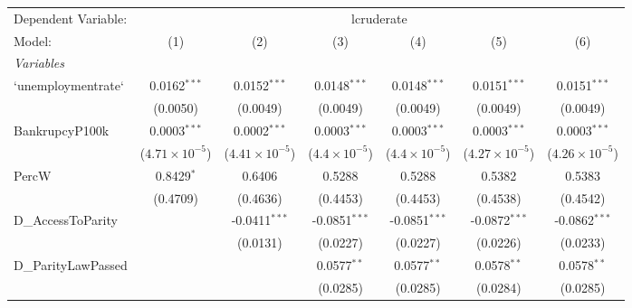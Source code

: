 
\begingroup
\centering
\begin{tabular}{lcccccc}
   \tabularnewline \midrule \midrule
   Dependent Variable: & \multicolumn{6}{c}{lcruderate}\\
   Model:                & (1)                     & (2)                     & (3)                    & (4)                    & (5)                     & (6)\\  
   \midrule
   \emph{Variables}\\
   `unemploymentrate`    & 0.0162$^{***}$          & 0.0152$^{***}$          & 0.0148$^{***}$         & 0.0148$^{***}$         & 0.0151$^{***}$          & 0.0151$^{***}$\\   
                         & (0.0050)                & (0.0049)                & (0.0049)               & (0.0049)               & (0.0049)                & (0.0049)\\   
   BankrupcyP100k        & 0.0003$^{***}$          & 0.0002$^{***}$          & 0.0003$^{***}$         & 0.0003$^{***}$         & 0.0003$^{***}$          & 0.0003$^{***}$\\   
                         & ($4.71\times 10^{-5}$)  & ($4.41\times 10^{-5}$)  & ($4.4\times 10^{-5}$)  & ($4.4\times 10^{-5}$)  & ($4.27\times 10^{-5}$)  & ($4.26\times 10^{-5}$)\\    
   PercW                 & 0.8429$^{*}$            & 0.6406                  & 0.5288                 & 0.5288                 & 0.5382                  & 0.5383\\   
                         & (0.4709)                & (0.4636)                & (0.4453)               & (0.4453)               & (0.4538)                & (0.4542)\\   
   D\_AccessToParity     &                         & -0.0411$^{***}$         & -0.0851$^{***}$        & -0.0851$^{***}$        & -0.0872$^{***}$         & -0.0862$^{***}$\\   
                         &                         & (0.0131)                & (0.0227)               & (0.0227)               & (0.0226)                & (0.0233)\\   
   D\_ParityLawPassed    &                         &                         & 0.0577$^{**}$          & 0.0577$^{**}$          & 0.0578$^{**}$           & 0.0578$^{**}$\\   
                         &                         &                         & (0.0285)               & (0.0285)               & (0.0284)                & (0.0285)\\   

\end{tabular}
